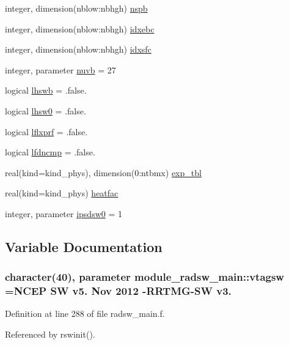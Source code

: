 \begin{DoxyCompactItemize}
integer, dimension(nblow\+:nbhgh) \hyperlink{group__module__radsw__main_ga6be022a4a1ae32248d9721a9fff93db6}{nspb}
\item 
integer, dimension(nblow\+:nbhgh) \hyperlink{group__module__radsw__main_gaa20102786f7e7f8c71fb2783082eac1b}{idxebc}
\item 
integer, dimension(nblow\+:nbhgh) \hyperlink{group__module__radsw__main_gad295d723dd7d269cb51c73923a4cbb94}{idxsfc}
\item 
integer, parameter \hyperlink{group__module__radsw__main_ga177282b3087dce2f54f1233ee8631231}{nuvb} = 27
\item 
logical \hyperlink{group__module__radsw__main_ga08bfecbd5edb2ad3ba0ae836cfe18d05}{lhswb} = .false.
\item 
logical \hyperlink{group__module__radsw__main_ga3fd8cae0d38772eea36ce6ec2d258997}{lhsw0} = .false.
\item 
logical \hyperlink{group__module__radsw__main_gac4ab674edb40fda0c89aa8ee331ccdc6}{lflxprf} = .false.
\item 
logical \hyperlink{group__module__radsw__main_ga8c0a241d6c1aa69fee4cd24fdbc4256b}{lfdncmp} = .false.
\item 
real(kind=kind\+\_\+phys), dimension(0\+:ntbmx) \hyperlink{group__module__radsw__main_ga1f9d18b17cc24321ed1cf45254ac2b0f}{exp\+\_\+tbl}
\item 
real(kind=kind\+\_\+phys) \hyperlink{group__module__radsw__main_gaad60e753cdda20d4e84d063280f0dfcc}{heatfac}
\item 
integer, parameter \hyperlink{group__module__radsw__main_gae1f88a0b60d69b892cfae83bb9ab67df}{ipsdsw0} = 1
\end{DoxyCompactItemize}


\subsection{Variable Documentation}
\subsubsection[{\texorpdfstring{vtagsw}{vtagsw}}]{\setlength{\rightskip}{0pt plus 5cm}character(40), parameter module\+\_\+radsw\+\_\+main\+::vtagsw =\textquotesingle{}N\+C\+EP SW v5. Nov 2012 -\/R\+R\+T\+MG-\/SW v3. \textquotesingle{}\hspace{0.3cm}{\ttfamily [private]}}\hypertarget{namespacemodule__radsw__main_a93334abce2ca8bfdcdfe5edd4ae1f093}{}\label{namespacemodule__radsw__main_a93334abce2ca8bfdcdfe5edd4ae1f093}


Definition at line 288 of file radsw\+\_\+main.\+f.



Referenced by rswinit().

